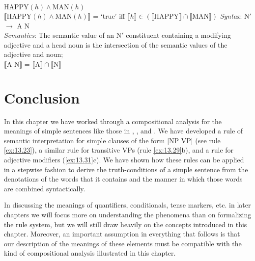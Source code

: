 \ea \label{ex:13.31}
\ea  $\text{HAPPY}(h) \wedge \text{MAN}(h)$\\
\ex  $\llbracket\text{HAPPY}(h) \wedge \text{MAN}(h)\rrbracket$  = ‘true’  iff  $\llbracket h\rrbracket \in (\llbracket\text{HAPPY}\rrbracket \cap \llbracket\text{MAN}\rrbracket)$
\ex  \textit{Syntax}: N$'$ $\rightarrow$  A N\\
     \textit{Semantics}: The semantic value of an N$'$ constituent containing a modifying adjective and a head noun is the intersection of the semantic values of the adjective and noun;\\
{}$\llbracket\text{A N}\rrbracket$  =  $\llbracket\text{A}\rrbracket \cap \llbracket\text{N}\rrbracket$ 
\z \z

\section{Conclusion}\label{sec:13.6}

In this chapter we have worked through a compositional analysis for the meanings of simple sentences like those in , , and . We have developed a rule of semantic interpretation for simple clauses of the form [NP VP] (see rule \ref{ex:13.23}), a similar rule for transitive VPs (rule \ref{ex:13.29}b), and a rule for adjective modifiers (\ref{ex:13.31}c). We have shown how these rules can be applied in a stepwise fashion to derive the truth-conditions of a simple sentence from the denotations of the words that it contains and the manner in which those words are combined syntactically.



In discussing the meanings of quantifiers, conditionals, tense markers, etc. in later chapters we will focus more on understanding the phenomena than on formalizing the rule system, but we will still draw heavily on the concepts introduced in this chapter. Moreover, an important assumption in everything that follows is that our description of the meanings of these elements must be compatible with the kind of compositional analysis illustrated in this chapter.\largerpage




